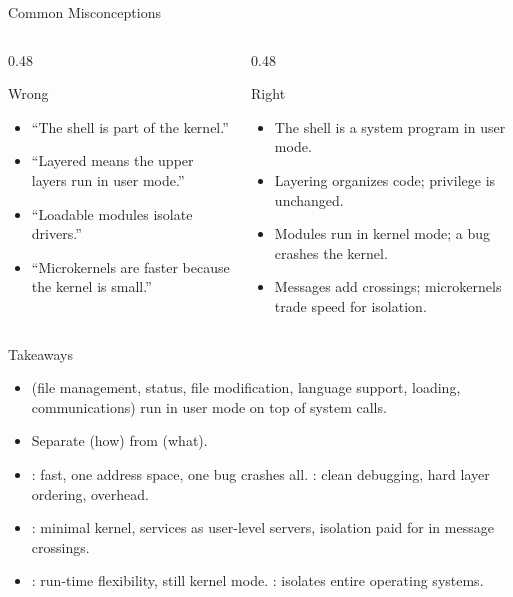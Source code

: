 \documentclass[aspectratio=169]{beamer}
\begin{document}
\begin{frame}{Common Misconceptions}
  \begin{columns}[T]
    \begin{column}{0.48\textwidth}
      \begin{block}{Wrong}
        \begin{itemize}
          \item ``The shell is part of the kernel.''
          \item ``Layered means the upper layers run in user mode.''
          \item ``Loadable modules isolate drivers.''
          \item ``Microkernels are faster because the kernel is small.''
        \end{itemize}
      \end{block}
    \end{column}
    \begin{column}{0.48\textwidth}
      \begin{block}{Right}
        \begin{itemize}
          \item The shell is a system program in user mode.
          \item Layering organizes code; privilege is unchanged.
          \item Modules run in kernel mode; a bug crashes the kernel.
          \item Messages add crossings; microkernels trade speed for
            isolation.
        \end{itemize}
      \end{block}
    \end{column}
  \end{columns}
\end{frame}

\begin{frame}{Takeaways}
  \begin{itemize}
    \item {} (file management, status, file modification,
      language support, loading, communications) run in user mode on top of
      system calls.
    \item Separate  (how) from  (what).
    \item {}: fast, one address space, one bug crashes all.
      : clean debugging, hard layer ordering, overhead.
    \item {}: minimal kernel, services as user-level servers,
      isolation paid for in message crossings.
    \item {}: run-time flexibility, still kernel mode.
      : isolates entire operating systems.
  \end{itemize}
\end{frame}
\end{document}
